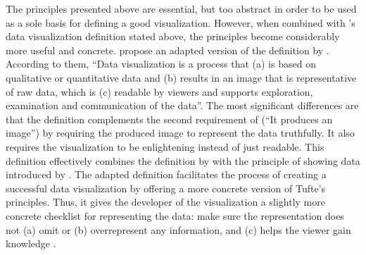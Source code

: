 The principles presented above are essential, but too abstract in order to be used as a sole basis for defining a good visualization. However, when combined with \citeauthor{kosara_visualization_2007}'s data visualization definition stated above, the principles become considerably more useful and concrete. \citet{azzam_j-b_2013} propose an adapted version of the definition by \citet{kosara_visualization_2007}. According to them, ``Data visualization is a process that (a) is based on qualitative or quantitative data and (b) results in an image that is representative of raw data, which is (c) readable by viewers and supports exploration, examination and communication of the data''. The most significant differences are that the definition complements the second requirement of \citeauthor{kosara_visualization_2007} (``It produces an image'') by requiring the produced image to represent the data truthfully. It also requires the visualization to be enlightening instead of just readable. This definition effectively combines the definition by \citet{kosara_visualization_2007} with the principle of showing data introduced by \citet{tufte_visual_1986}. The adapted definition facilitates the process of creating a successful data visualization by offering a more concrete version of Tufte's principles. Thus, it gives the developer of the visualization a slightly more concrete checklist for representing the data: make sure the representation does not (a) omit or (b) overrepresent any information, and (c) helps the viewer gain knowledge \citep{azzam_j-b_2013}. 


